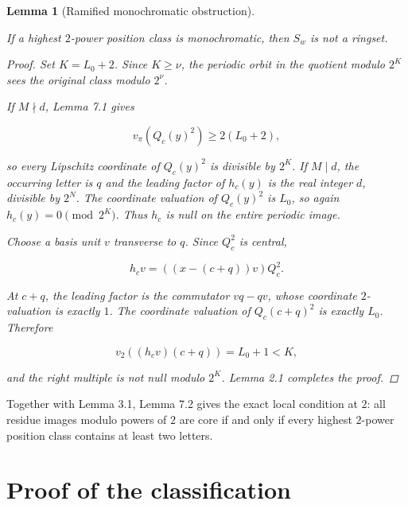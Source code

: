 \documentclass[11pt]{article}
\newtheorem{lemma}[theorem]{Lemma}
\numberwithin{equation}{section}
\begin{document}
\begin{lemma}[Ramified monochromatic obstruction]
\label{lem:ramified-obstruction}

If a highest $2$-power position class is monochromatic, then $S_w$ is not a
ringset.

\begin{proof}

Set $K=L_0+2$. Since $K\ge\nu$, the periodic orbit in the quotient modulo
$2^K$ sees the original class modulo $2^\nu$.

If $M\nmid d$, Lemma 7.1 gives

\nopagebreak[4]
\[
v_\pi(Q_c(y)^2)\ge2(L_0+2),
\]

so every Lipschitz coordinate of $Q_c(y)^2$ is divisible by $2^K$. If
$M\mid d$, the occurring letter is $q$ and the leading factor of $h_c(y)$
is the real integer $d$, divisible by $2^N$. The coordinate valuation of
$Q_c(y)^2$ is $L_0$, so again $h_c(y)=0\pmod {2^K}$. Thus $h_c$ is null on
the entire periodic image.

Choose a basis unit $v$ transverse to $q$. Since $Q_c^2$ is central,

\nopagebreak[4]
\[
h_cv=((x-(c+q))v)Q_c^2.
\]

At $c+q$, the leading factor is the commutator $vq-qv$, whose coordinate
$2$-valuation is exactly $1$. The coordinate valuation of
$Q_c(c+q)^2$ is exactly $L_0$. Therefore

\nopagebreak[4]
\[
v_2((h_cv)(c+q))=L_0+1<K,
\]

and the right multiple is not null modulo $2^K$. Lemma 2.1 completes the
proof.
\end{proof}

\end{lemma}


Together with Lemma 3.1, Lemma 7.2 gives the exact local condition at $2$:
all residue images modulo powers of $2$ are core if and only if every
highest $2$-power position class contains at least two letters.

\section{Proof of the classification}
\end{document}
